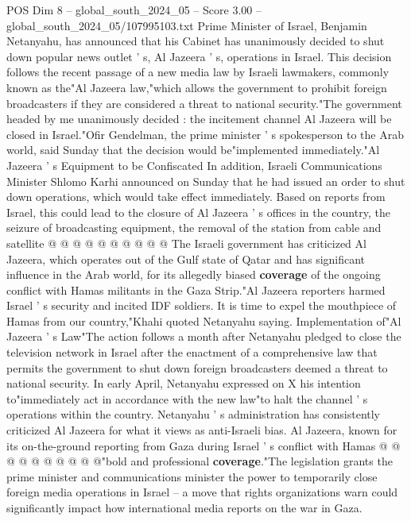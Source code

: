 \begin{textsample}{POS Dim 8 – global\_south\_2024\_05 – Score 3.00 – global\_south\_2024\_05/107995103.txt}  \label{ex:f8_pos_348}
Prime Minister of Israel, Benjamin Netanyahu, has announced that his Cabinet has unanimously decided to shut down popular news outlet ' s, Al Jazeera ' s, operations in Israel.
This decision follows the recent passage of a new media law by Israeli lawmakers, commonly known as the"Al Jazeera law,"which allows the government to prohibit foreign broadcasters if they are considered a threat to national security."The government headed by me unanimously decided : the incitement channel Al Jazeera will be closed in Israel."Ofir Gendelman, the prime minister ' s spokesperson to the Arab world, said Sunday that the decision would be"implemented immediately."Al Jazeera ' s Equipment to be Confiscated In addition, Israeli Communications Minister Shlomo Karhi announced on Sunday that he had issued an order to shut down operations, which would take effect immediately.
Based on reports from Israel, this could lead to the closure of Al Jazeera ' s offices in the country, the seizure of broadcasting equipment, the removal of the station from cable and satellite @ @ @ @ @ @ @ @ @ @ The Israeli government has criticized Al Jazeera, which operates out of the Gulf state of Qatar and has significant influence in the Arab world, for its allegedly biased \textbf{coverage} of the ongoing conflict with Hamas militants in the Gaza Strip."Al Jazeera reporters harmed Israel ' s security and incited IDF soldiers.
It is time to expel the mouthpiece of Hamas from our country,"Khahi quoted Netanyahu saying.
Implementation of"Al Jazeera ' s Law"The action follows a month after Netanyahu pledged to close the television network in Israel after the enactment of a comprehensive law that permits the government to shut down foreign broadcasters deemed a threat to national security.
In early April, Netanyahu expressed on X his intention to"immediately act in accordance with the new law"to halt the channel ' s operations within the country.
Netanyahu ' s administration has consistently criticized Al Jazeera for what it views as anti-Israeli bias.
Al Jazeera, known for its on-the-ground reporting from Gaza during Israel ' s conflict with Hamas @ @ @ @ @ @ @ @ @ @"bold and professional \textbf{coverage}."The legislation grants the prime minister and communications minister the power to temporarily close foreign media operations in Israel -- a move that rights organizations warn could significantly impact how international media reports on the war in Gaza.

\end{textsample}
